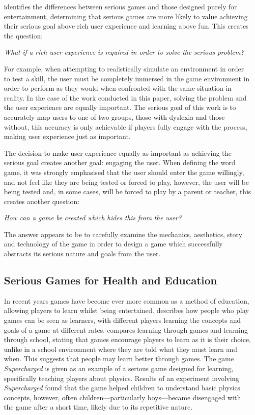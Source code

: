\documentclass[journal]{IEEEtran}
\newcommand{\cquestion}[1]{\begin{center}
							\textit{#1?}
						\end{center}
					}
\begin{document}
\cite{SeriousOverview} identifies the differences between serious games and those designed purely for entertainment, determining that serious games are more likely to value achieving their serious goal above rich user experience and learning above fun. This creates the question:
\cquestion{What if a rich user experience is required in order to solve the serious problem}

For example, when attempting to realistically simulate an environment in order to test a skill, the user must be completely immersed in the game environment in order to perform as they would when confronted with the same situation in reality. 
In the case of the work conducted in this paper, solving the problem and the user experience are equally important. The serious goal of this work is to accurately map users to one of two groups, those with dyslexia and those without, this accuracy is only achievable if players fully engage with the process, making user experience just as important. 

The decision to make user experience equally as important as achieving the serious goal creates another goal: engaging the user. When defining the word game, it was strongly emphasised that the user should enter the game willingly, and not feel like they are being tested or forced to play, however, the user will be being tested and, in some cases, will be forced to play by a parent or teacher, this creates another question:
\cquestion{How can a game be created which hides this from the user}

The answer appears to be to carefully examine the mechanics, aesthetics, story and technology of the game in order to design a game which successfully abstracts its serious nature and goals from the user.

\subsection{Serious Games for Health and Education}
In recent years games have become ever more common as a method of education\cite{stapleton2004}, allowing players to learn whilst being entertained.
 \cite{stapleton2004} describes how people who play games can be seen as learners, with different players learning the concepts and goals of a game at different rates. \cite{stapleton2004} compares learning through games and learning through school, stating that games encourage players to learn as it is their choice, unlike in a school environment where they are told what they must learn and when. This suggests that people may learn better through games.
The game \emph{Supercharged} is given as an example of a serious game designed for learning, specifically teaching players about physics\cite{supercharged}. Results of an experiment involving \emph{Supercharged} found that the game helped children to understand basic physics concepts, however, often children---particularly boys---became disengaged with the game after a short time\cite{supercharged}, likely due to its repetitive nature.
\end{document}
